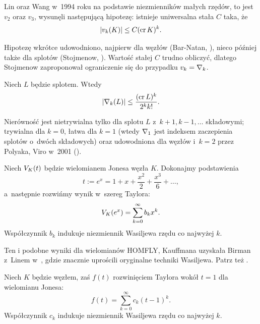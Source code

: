 %
Lin oraz Wang \cite{wang96} w~1994 roku na podstawie niezmienników małych rzędów, to jest $v_2$ oraz $v_3$, wysunęli następującą hipotezę: istnieje uniwersalna stała $C$ taka, że
\begin{equation}
    |v_k(K)| \le C (\operatorname{cr} K)^k.
\end{equation}

Hipotezę wkrótce udowodniono, najpierw dla węzłów (Bar-Natan, \cite{barnatan95}), nieco później także dla splotów (Stojmenow, \cite{stoimenow_01}).
Wartość stałej $C$ trudno obliczyć, dlatego Stojmenow zaproponował \cite[problem 1.17]{ohtsuki02} ograniczenie się do przypadku $v_k = \nabla_k$.

\begin{conjecture}
    Niech $L$ będzie splotem.
    Wtedy
    \begin{equation}
        |\nabla_k(L)| \le \frac{(\operatorname{cr} L)^k}{2^kk!}.
    \end{equation}
\end{conjecture}

Nierówność jest nietrywialna tylko dla splotu $L$ z~$k+1, k-1, \ldots$ składowymi; trywialna dla $k = 0$, łatwa dla $k=1$ (wtedy $\nabla_1$ jest indeksem zaczepienia splotów o~dwóch składowych) oraz udowodniona dla węzłów i~$k=2$ przez Polyaka, Viro w~2001 (\cite{polyak01}).

\begin{example}
%
    Niech $V_K(t)$ będzie wielomianem Jonesa węzła $K$.
    Dokonajmy podstawienia
    \begin{equation}
        t := e^x = 1 + x + \frac{x^2}{2} + \frac{x^3}{6} + \ldots,
    \end{equation}
    a~następnie rozwińmy wynik w~szereg Taylora:
    \begin{equation}
        V_K(e^x) = \sum_{k = 0}^\infty b_k x^k.
    \end{equation}
    Współczynnik $b_{k}$ indukuje niezmiennik Wasiljewa rzędu co najwyżej $k$.
\end{example}

Ten i podobne wyniki dla wielomianów HOMFLY, Kauffmana uzyskała Birman z~Linem w~\cite{birman93}, gdzie znacznie uprościli oryginalne techniki Wasiljewa.
Patrz też \cite[s. 56]{chmutov12}.

\begin{example}
    Niech $K$ będzie węzłem, zaś $f(t)$ rozwinięciem Taylora wokół $t = 1$ dla wielomianu Jonesa:
    \begin{equation}
        f(t) = \sum_{k = 0}^\infty c_k (t-1)^k.
    \end{equation}
    Współczynnik $c_{k}$ indukuje niezmiennik Wasiljewa rzędu co najwyżej $k$.
\end{example}

